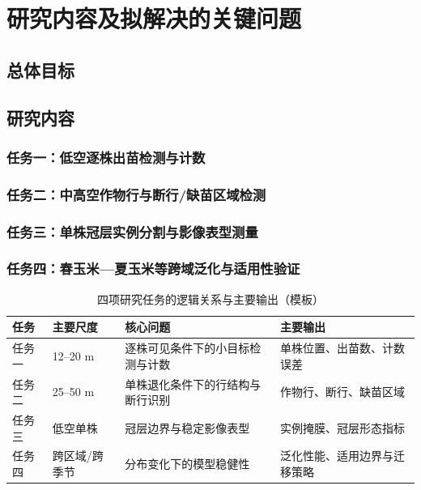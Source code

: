 \chapter{研究内容及拟解决的关键问题}

\section{总体目标}

\section{研究内容}

\subsection{任务一：低空逐株出苗检测与计数}

\subsection{任务二：中高空作物行与断行/缺苗区域检测}

\subsection{任务三：单株冠层实例分割与影像表型测量}

\subsection{任务四：春玉米—夏玉米等跨域泛化与适用性验证}

\begin{table}[htbp]
  \centering
  \caption{四项研究任务的逻辑关系与主要输出（模板）}
  \begin{tabular}{p{}p{}p{}p{}}
    \toprule
    任务 & 主要尺度 & 核心问题 & 主要输出 \\
    \midrule
    任务一 & 12--20 m & 逐株可见条件下的小目标检测与计数 & 单株位置、出苗数、计数误差 \\
    任务二 & 25--50 m & 单株退化条件下的行结构与断行识别 & 作物行、断行、缺苗区域 \\
    任务三 & 低空单株 & 冠层边界与稳定影像表型 & 实例掩膜、冠层形态指标 \\
    任务四 & 跨区域/跨季节 & 分布变化下的模型稳健性 & 泛化性能、适用边界与迁移策略 \\
    \bottomrule
  \end{tabular}
\end{table}

